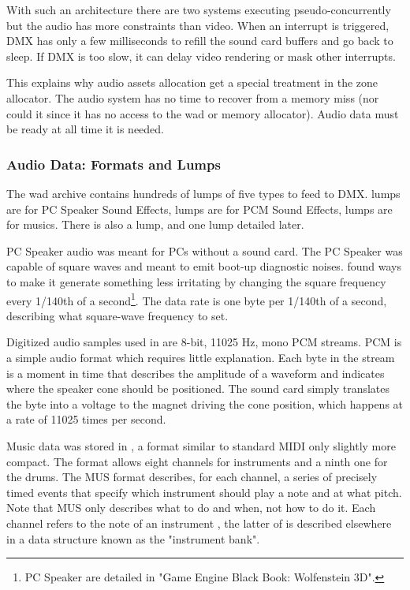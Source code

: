 With such an architecture there are two systems executing pseudo-concurrently but the audio has more constraints than video. When an interrupt is triggered, DMX has only a few milliseconds to refill the sound card buffers and go back to sleep. If DMX is too slow, it can delay video rendering or mask other interrupts.\\
\par
 This explains why audio assets allocation get a special treatment in the zone allocator. The audio system has no time to recover from a memory miss (nor could it since it has no access to the wad or memory allocator). Audio data must be ready at all time it is needed.

\subsubsection{Audio Data: Formats and Lumps}
The wad archive contains hundreds of lumps of five types to feed to DMX.  lumps are for PC Speaker Sound Effects,  lumps are for PCM Sound Effects,  lumps are for musics. There is also a  lump, and one  lump detailed later.\\
\par
PC Speaker audio was meant for PCs without a sound card. The PC Speaker was capable of square waves and meant to emit boot-up diagnostic noises. \doom{} found ways to make it generate something less irritating by changing the square frequency every 1/140th of a second\footnote{PC Speaker are detailed in "Game Engine Black Book: Wolfenstein 3D".}. The data rate is one byte per 1/140th of a second, describing what square-wave frequency to set.\\
\par
 Digitized audio samples used in \doom{} are 8-bit, 11025 Hz, mono PCM streams. PCM is a simple audio format which requires little explanation. Each byte in the stream is a moment in time that describes the amplitude of a waveform and indicates where the speaker cone should be positioned. The sound card simply translates the byte into a voltage to the magnet driving the cone position, which happens at a rate of 11025 times per second.\\
\par
Music data was stored in , a format similar to standard MIDI only slightly more compact. The format allows eight channels for instruments and a ninth one for the drums. The MUS format describes, for each channel, a series of precisely timed events that specify which instrument should play a note and at what pitch. Note that MUS only describes what to do and when, not how to do it. Each channel refers to the note of an instrument , the latter of is described elsewhere in a data structure known as the "instrument bank".\\
